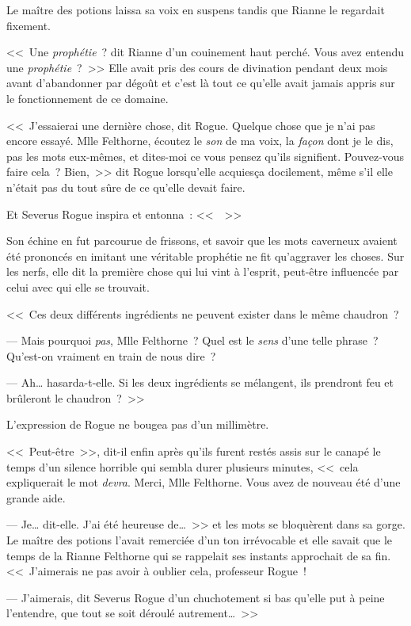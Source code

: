 Le maître des potions laissa sa voix en suspens tandis que Rianne le regardait fixement.

<<~Une \emph{prophétie}~? dit Rianne d'un couinement haut perché. Vous avez entendu une \emph{prophétie}~?~>> Elle avait pris des cours de divination pendant deux mois avant d'abandonner par dégoût et c'est là tout ce qu'elle avait jamais appris sur le fonctionnement de ce domaine.

<<~J'essaierai une dernière chose, dit Rogue. Quelque chose que je n'ai pas encore essayé. Mlle Felthorne, écoutez le \emph{son} de ma voix, la \emph{façon} dont je le dis, pas les mots eux-mêmes, et dites-moi ce vous pensez qu'ils signifient. Pouvez-vous faire cela~? Bien,~>> dit Rogue lorsqu'elle acquiesça docilement, même s'il elle n'était pas du tout sûre de ce qu'elle devait faire.

Et Severus Rogue inspira et entonna~: <<~~>>

Son échine en fut parcourue de frissons, et savoir que les mots caverneux avaient été prononcés en imitant une véritable prophétie ne fit qu'aggraver les choses. Sur les nerfs, elle dit la première chose qui lui vint à l'esprit, peut-être influencée par celui avec qui elle se trouvait.

<<~Ces deux différents ingrédients ne peuvent exister dans le même chaudron~?

--- Mais pourquoi \emph{pas}, Mlle Felthorne~? Quel est le \emph{sens} d'une telle phrase~? Qu'est-on vraiment en train de nous dire~?

--- Ah… hasarda-t-elle. Si les deux ingrédients se mélangent, ils prendront feu et brûleront le chaudron~?~>>

L'expression de Rogue ne bougea pas d'un millimètre.

<<~Peut-être~>>, dit-il enfin après qu'ils furent restés assis sur le canapé le temps d'un silence horrible qui sembla durer plusieurs minutes, <<~cela expliquerait le mot \emph{devra}. Merci, Mlle Felthorne. Vous avez de nouveau été d'une grande aide.

--- Je… dit-elle. J'ai été heureuse de…~>> et les mots se bloquèrent dans sa gorge. Le maître des potions l'avait remerciée d'un ton irrévocable et elle savait que le temps de la Rianne Felthorne qui se rappelait ses instants approchait de sa fin. <<~J'aimerais ne pas avoir à oublier cela, professeur Rogue~!

--- J'aimerais, dit Severus Rogue d'un chuchotement si bas qu'elle put à peine l'entendre, que tout se soit déroulé autrement…~>>


